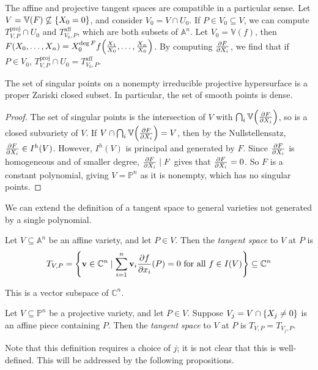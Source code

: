 The affine and projective tangent spaces are compatible in a particular sense.
Let \( V = \mathbb V(F) \not\subseteq \qty{X_0 = 0} \), and consider \( V_0 = V \cap U_0 \).
If \( P \in V_0 \subseteq V \), we can compute \( T_{V,P}^{\mathrm{proj}} \cap U_0 \) and \( T_{V_0,P}^{\mathrm{aff}} \), which are both subsets of \( \mathbb A^n \).
Let \( V_0 = \mathbb V(f) \), then \( F(X_0, \dots, X_n) = X_0^{\deg F} f\qty(\frac{X_1}{X_0}, \dots, \frac{X_n}{X_0}) \).
By computing \( \pdv{F}{X_i} \), we find that if \( P \in V_0 \), \( T_{V,P}^{\mathrm{proj}} \cap U_0 = T_{V_0,P}^{\mathrm{aff}} \).
\begin{proposition}
    The set of singular points on a nonempty irreducible projective hypersurface is a proper Zariski closed subset.
    In particular, the set of smooth points is dense.
\end{proposition}
\begin{proof}
    The set of singular points is the intersection of \( V \) with \( \bigcap_i \mathbb V\qty(\pdv{F}{X_i}) \), so is a closed subvariety of \( V \).
    If \( V \cap \bigcap_i \mathbb V\qty(\pdv{F}{X_i}) = V \), then by the Nullstellensatz, \( \pdv{F}{X_i} \in I^h(V) \).
    However, \( I^h(V) \) is principal and generated by \( F \).
    Since \( \pdv{F}{X_i} \) is homogeneous and of smaller degree, \( \pdv{F}{X_i} \mid F \) gives that \( \pdv{F}{X_i} = 0 \).
    So \( F \) is a constant polynomial, giving \( V = \mathbb P^n \) as it is nonempty, which has no singular points.
\end{proof}
We can extend the definition of a tangent space to general varieties not generated by a single polynomial.
\begin{definition}
    Let \( V \subseteq \mathbb A^n \) be an affine variety, and let \( P \in V \).
    Then the \emph{tangent space} to \( V \) at \( P \) is
    \[ T_{V,P} = \qty{\vb v \in \mathbb C^n \mid \sum_{i=1}^n \vb v_i \pdv{f}{x_i}\qty(P) = 0 \text{ for all } f \in I(V)} \subseteq \mathbb C^n \]
\end{definition}
This is a vector subspace of \( \mathbb C^n \).
\begin{definition}
    Let \( V \subseteq \mathbb P^n \) be a projective variety, and let \( P \in V \).
    Suppose \( V_j = V \cap \qty{X_j \neq 0} \) is an affine piece containing \( P \).
    Then the \emph{tangent space} to \( V \) at \( P \) is \( T_{V,P} = T_{V_j,P} \).
\end{definition}
Note that this definition requires a choice of \( j \); it is not clear that this is well-defined.
This will be addressed by the following propositions.

